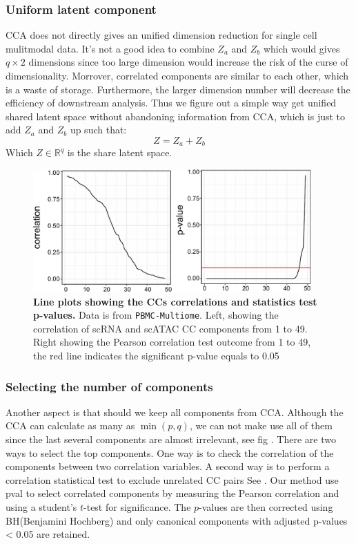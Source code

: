 \subsubsection{Uniform latent component}
CCA does not directly gives an unified dimension reduction for single cell mulitmodal data. It's not a good idea to combine $Z_a$ and $Z_b$ which would gives $q\times 2$ dimensions since too large dimension would increase the risk of the curse of dimensionality. Morrover, correlated components are similar to each other, which is a waste of storage. Furthermore, the larger dimension number will decrease the efficiency of downstream analysis. Thus we figure out a simple way get unified shared latent space without abandoning information from CCA, which is just to add $Z_a$ and $Z_b$ up such that:
\begin{equation}
    Z = Z_a + Z_b
\end{equation}
Which $Z\in \mathbb{R}^{q}$ is the share latent space. 

\begin{figure}[!ht]
	\centering
	\includegraphics[width=0.95\textwidth]{CC_pval_select/fig}
	\vspace{0.1cm}
	\caption[Line plots showing the CCs correlations and statistics test p-values.]{\textbf{Line plots showing the CCs correlations and statistics test p-values.} Data is from \texttt{PBMC-Multiome}. Left, showing the correlation of scRNA and scATAC CC components from 1 to 49. Right showing the Pearson correlation test outcome from 1 to 49, the red line indicates the significant p-value equals to 0.05}
	\label{fig:CC_pval_select}
\end{figure}

\subsubsection{Selecting the number of components}
Another aspect is that should we keep all components from CCA. Although the CCA can calculate as many as $\min(p, q)$, we can not make use all of them since the last several components are almost irrelevant, see fig . There are two ways to select the top components. One way is to check the correlation of the components between two correlation variables. A second way is to perform a correlation statistical test to exclude unrelated CC pairs See . Our method use pval to select correlated components by measuring the Pearson correlation and using a student's $t$-test for significance. The $p$-values are then corrected using BH(Benjamini Hochberg)\cite{benjamini1995controlling} and only canonical components with adjusted p-values < 0.05 are retained. 

